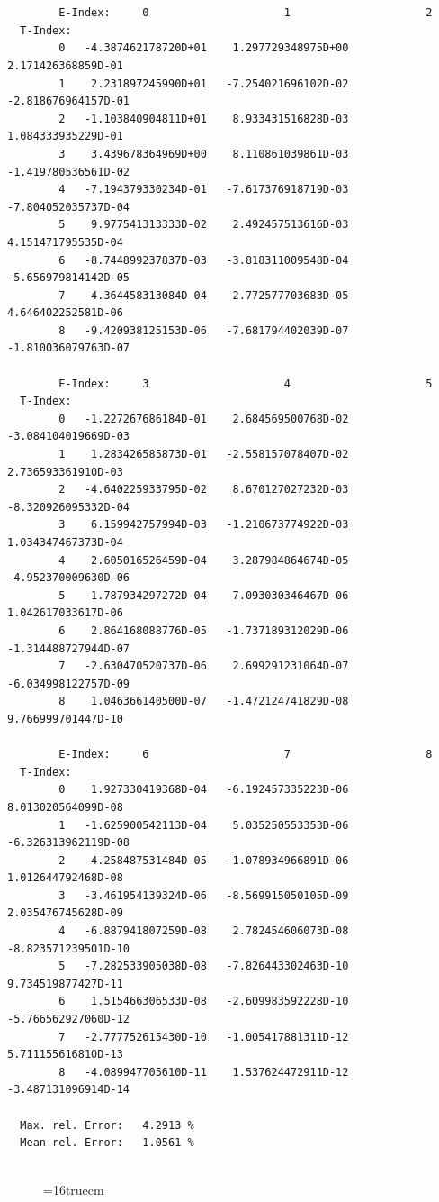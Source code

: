 \documentclass[12pt,dvips]{article}
\begin{document}
\begin{small}\begin{verbatim}


        E-Index:     0                     1                     2
  T-Index:
        0   -4.387462178720D+01    1.297729348975D+00    2.171426368859D-01
        1    2.231897245990D+01   -7.254021696102D-02   -2.818676964157D-01
        2   -1.103840904811D+01    8.933431516828D-03    1.084333935229D-01
        3    3.439678364969D+00    8.110861039861D-03   -1.419780536561D-02
        4   -7.194379330234D-01   -7.617376918719D-03   -7.804052035737D-04
        5    9.977541313333D-02    2.492457513616D-03    4.151471795535D-04
        6   -8.744899237837D-03   -3.818311009548D-04   -5.656979814142D-05
        7    4.364458313084D-04    2.772577703683D-05    4.646402252581D-06
        8   -9.420938125153D-06   -7.681794402039D-07   -1.810036079763D-07

        E-Index:     3                     4                     5
  T-Index:
        0   -1.227267686184D-01    2.684569500768D-02   -3.084104019669D-03
        1    1.283426585873D-01   -2.558157078407D-02    2.736593361910D-03
        2   -4.640225933795D-02    8.670127027232D-03   -8.320926095332D-04
        3    6.159942757994D-03   -1.210673774922D-03    1.034347467373D-04
        4    2.605016526459D-04    3.287984864674D-05   -4.952370009630D-06
        5   -1.787934297272D-04    7.093030346467D-06    1.042617033617D-06
        6    2.864168088776D-05   -1.737189312029D-06   -1.314488727944D-07
        7   -2.630470520737D-06    2.699291231064D-07   -6.034998122757D-09
        8    1.046366140500D-07   -1.472124741829D-08    9.766999701447D-10

        E-Index:     6                     7                     8
  T-Index:
        0    1.927330419368D-04   -6.192457335223D-06    8.013020564099D-08
        1   -1.625900542113D-04    5.035250553353D-06   -6.326313962119D-08
        2    4.258487531484D-05   -1.078934966891D-06    1.012644792468D-08
        3   -3.461954139324D-06   -8.569915050105D-09    2.035476745628D-09
        4   -6.887941807259D-08    2.782454606073D-08   -8.823571239501D-10
        5   -7.282533905038D-08   -7.826443302463D-10    9.734519877427D-11
        6    1.515466306533D-08   -2.609983592228D-10   -5.766562927060D-12
        7   -2.777752615430D-10   -1.005417881311D-12    5.711155616810D-13
        8   -4.089947705610D-11    1.537624472911D-12   -3.487131096914D-14

  Max. rel. Error:   4.2913 %
  Mean rel. Error:   1.0561 %


\end{verbatim}\end{small}
\begin{figure} \label{2.2d}
\epsfxsize=16truecm
\end{figure}
\newpage
\end{document}
